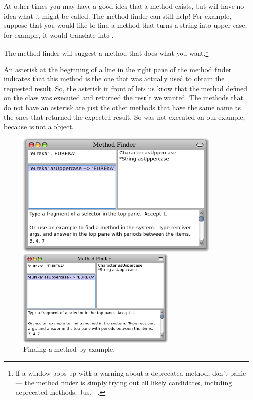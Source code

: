 \documentclass[a4paper,10pt,twoside]{book}
\begin{document}
At other times you may have a good idea that a method exists, but will have no idea what it might be called.
The method finder can still help!  For example, suppose that you would like to find a method that turns a string into upper case, for example, it would translate  into .

\noindent
The method finder will suggest a method that does what you want.\footnote{If a window pops up with a warning about a deprecated method, don't panic --- the method finder is simply trying out all likely candidates, including deprecated methods. Just \click ~.}

An asterisk at the beginning of a line in the right pane of the method finder indicates that this method is the one that was actually used to obtain the requested result. 
So, the asterisk in front of  lets us know that the method  defined on the class  was executed and returned the result we wanted. The methods that do not have an asterisk are just the other methods that have the same name as the ones that returned the expected result. So  was not executed on our example, because  is not a  object.

\begin{figure}[hbt]
\ifluluelse
	{\centerline {\includegraphics[width=0.9\textwidth]{MethodFinder-example1}}}
	{\centerline {\includegraphics[width=0.7\textwidth]{MethodFinder-example1}}}
\caption{Finding a method by example.
\label{fig:methodFinder-example1}}
\end{figure}
\end{document}
